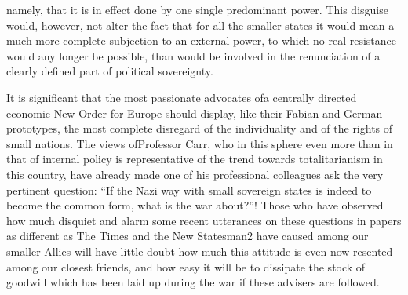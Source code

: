 \documentclass[11pt,openany]{book}
\begin{document}
namely, that it is in effect done by one single predominant power. This disguise would, however, not alter the fact that for all the smaller states it would mean a much more complete subjection to an external power, to which no real resistance would any longer be possible, than would be involved in the renunciation of a clearly defined part of political sovereignty.

It is significant that the most passionate advocates ofa centrally directed economic New Order for Europe should display, like their Fabian and German prototypes, the most complete disregard of the individuality and of the rights of small nations. The views ofProfessor Carr, who in this sphere even more than in that of internal policy is representative of the trend towards totalitarianism in this country, have already made one of his professional colleagues ask the very pertinent question: ``If the Nazi way with small sovereign states is indeed to become the common form, what is the war about?''! Those who have observed how much disquiet and alarm some recent utterances on these questions in papers as different as The Times and the New Statesman2 have caused among our smaller Allies will have little doubt how much this attitude is even now resented among our closest friends, and how easy it will be to dissipate the stock of goodwill which has been laid up during the war if these advisers are followed.

\begin{center}\textasteriskcentered\hspace{0.9em}\textasteriskcentered\hspace{0.9em}\textasteriskcentered\end{center}

\begin{center}\textasteriskcentered\hspace{0.9em}\textasteriskcentered\hspace{0.9em}\textasteriskcentered\end{center}

\begin{center}\textasteriskcentered\hspace{0.9em}\textasteriskcentered\hspace{0.9em}\textasteriskcentered\end{center}

\begin{center}\textasteriskcentered\hspace{0.9em}\textasteriskcentered\hspace{0.9em}\textasteriskcentered\end{center}
\end{document}
